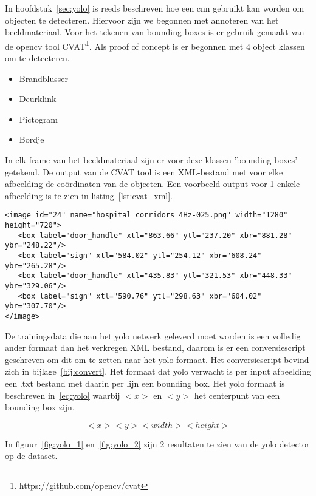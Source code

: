    In hoofdstuk~\ref{sec:yolo} is reeds beschreven hoe een \gls{cnn} gebruikt kan worden om objecten te detecteren. Hiervoor zijn we begonnen met annoteren van het beeldmateriaal.
   Voor het tekenen van bounding boxes is er gebruik gemaakt van de opencv tool CVAT\footnote{https://github.com/opencv/cvat}. Als proof of concept is er begonnen met 4 object klassen om te detecteren.

   \begin{itemize}
      \item Brandblusser
      \item Deurklink
      \item Pictogram
      \item Bordje
   \end{itemize}

   In elk frame van het beeldmateriaal zijn er voor deze klassen 'bounding boxes' getekend. De output van de CVAT tool is een XML-bestand met voor elke afbeelding de co\"{o}rdinaten van de objecten.
   Een voorbeeld output voor 1 enkele afbeelding is te zien in listing~\ref{lst:cvat_xml}.

   \begin{lstlisting}
<image id="24" name="hospital_corridors_4Hz-025.png" width="1280" height="720">
   <box label="door_handle" xtl="863.66" ytl="237.20" xbr="881.28" ybr="248.22"/>
   <box label="sign" xtl="584.02" ytl="254.12" xbr="608.24" ybr="265.28"/>
   <box label="door_handle" xtl="435.83" ytl="321.53" xbr="448.33" ybr="329.06"/>
   <box label="sign" xtl="590.76" ytl="298.63" xbr="604.02" ybr="307.70"/>
</image>     
   \end{lstlisting}

   De trainingsdata die aan het \gls{yolo} netwerk geleverd moet worden is een volledig ander formaat dan het verkregen XML bestand, daarom is er een conversiescript geschreven om dit om te zetten naar het \gls{yolo} formaat.
   Het conversiescript bevind zich in bijlage~\ref{bij:convert}. 
   Het formaat dat \gls{yolo} verwacht is per input afbeelding een .txt bestand met daarin per lijn een bounding box. Het \gls{yolo} formaat is beschreven in~\ref{eq:yolo} waarbij $<x>$ en $<y>$ het centerpunt van een bounding box zijn.

   \begin{equation} \label{eq:yolo}
      <x> <y> <width> <height> 
   \end{equation}

   In figuur~\ref{fig:yolo_1} en~\ref{fig:yolo_2} zijn 2 resultaten te zien van de \gls{yolo} detector op de dataset.

